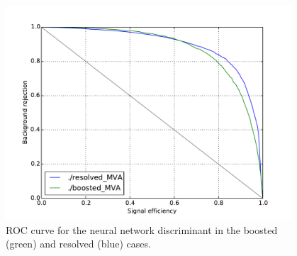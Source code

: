 \begin{figure}[h]
\begin{center}
\includegraphics[width=0.95\textwidth]{plots/example_roc.pdf}
\caption{ROC curve for the neural network discriminant in the boosted (green) and resolved (blue) cases.}
\label{fig:exampleroc}
\end{center}
\end{figure}

